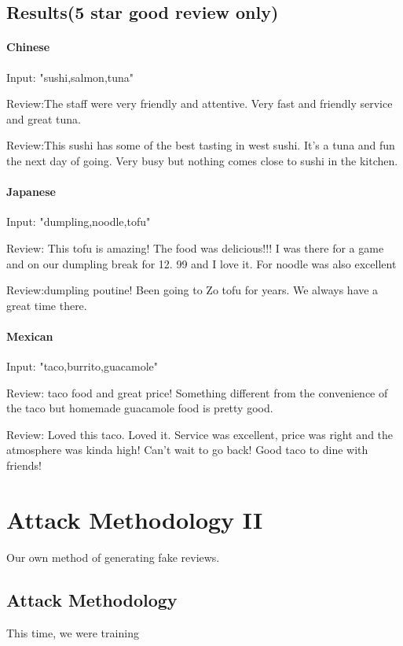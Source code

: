 \documentclass[conference]{IEEEtran}
\begin{document}
\subsection{Results(5 star good review only)}
\paragraph{Chinese}\mbox{}
\par Input: "sushi,salmon,tuna"
\par Review:The staff were very friendly and attentive. Very fast and friendly service and great tuna.
\par Review:This sushi has some of the best tasting in west sushi. It's a tuna and fun the next day of going. Very busy but nothing comes close to sushi in the kitchen.
\paragraph{Japanese}\mbox{}
\par Input: "dumpling,noodle,tofu"
\par Review: This tofu is amazing! The food was delicious!!! I was there for a game and on our dumpling break for 12. 99 and I love it. For noodle was also excellent
\par Review:dumpling poutine! Been going to Zo tofu for years. We always have a great time there.
\paragraph{Mexican}\mbox{}
\par Input: "taco,burrito,guacamole"
\par Review: taco food and great price! Something different from the convenience of the taco but homemade guacamole food is pretty good.
\par Review: Loved this taco. Loved it. Service was excellent, price was right and the atmosphere was kinda high! Can't wait to go back! Good taco to dine with friends!


\section{Attack Methodology II}
Our own method of generating fake reviews.
\subsection{Attack Methodology}
\par This time, we were training 
\end{document}
